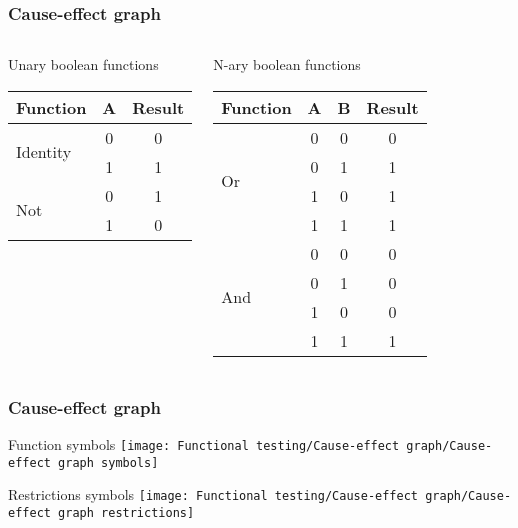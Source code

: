\begin{frame}
\frametitle{Cause-effect graph}


\begin{columns}[t]
\begin{block:fact}{Unary boolean functions}
\begin{tabular}{l|c|c}
\textbf{Function}			& \textbf{A}	& \textbf{Result}\\\hline\hline
\multirow{2}{*}{Identity} 	& 0 			& 0\\
							& 1 			& 1\\\hline\hline
\multirow{2}{*}{Not}		& 0 			& 1\\
							& 1				& 0\\
\end{tabular}
\end{block:fact}

\qquad
{}
\begin{block:fact}{N-ary boolean functions}
\begin{tabular}{l|c|c|c}
\textbf{Function}			& \textbf{A}	& \textbf{B}	& \textbf{Result}\\\hline\hline
\multirow{4}{*}{Or} 		& 0 			& 0				& 0\\
							& 0 			& 1				& 1\\
							& 1 			& 0				& 1\\
							& 1 			& 1				& 1\\\hline\hline
\multirow{4}{*}{And}		& 0 			& 0				& 0\\
							& 0 			& 1				& 0\\
							& 1 			& 0				& 0\\
							& 1 			& 1				& 1\\
\end{tabular}
\end{block:fact}
\end{columns}

\end{frame}



\begin{frame}
\frametitle{Cause-effect graph}

\begin{block}{Function symbols}
\texttt{[image: Functional testing/Cause-effect graph/Cause-effect graph symbols]}
\end{block}

\begin{block}{Restrictions symbols}
\texttt{[image: Functional testing/Cause-effect graph/Cause-effect graph restrictions]}
\end{block}

\end{frame}





